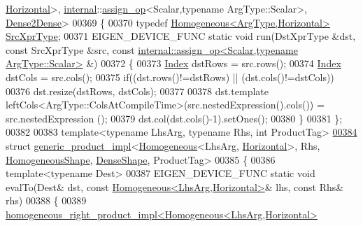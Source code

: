 \begin{DoxyCode}
      \hyperlink{group__enums_ggad49a7b3738e273eb00932271b36127f7aae8a16b3b9272683c1162915f6d892be}{Horizontal}>, \hyperlink{namespaceinternal}{internal}::\hyperlink{struct_eigen_1_1internal_1_1assign__op}{assign\_op}<Scalar,typename ArgType::Scalar>, 
      \hyperlink{struct_eigen_1_1internal_1_1_dense2_dense}{Dense2Dense}>
00369 \{
00370   \textcolor{keyword}{typedef} \hyperlink{group___geometry___module_class_eigen_1_1_homogeneous}{Homogeneous<ArgType,Horizontal>} 
      \hyperlink{group___geometry___module_class_eigen_1_1_homogeneous}{SrcXprType};
00371   EIGEN\_DEVICE\_FUNC \textcolor{keyword}{static} \textcolor{keywordtype}{void} run(DstXprType &dst, \textcolor{keyword}{const} SrcXprType &src, \textcolor{keyword}{const} 
      \hyperlink{struct_eigen_1_1internal_1_1assign__op}{internal::assign\_op<Scalar,typename ArgType::Scalar>} &)
00372   \{
00373     \hyperlink{namespace_eigen_a62e77e0933482dafde8fe197d9a2cfde}{Index} dstRows = src.rows();
00374     \hyperlink{namespace_eigen_a62e77e0933482dafde8fe197d9a2cfde}{Index} dstCols = src.cols();
00375     \textcolor{keywordflow}{if}((dst.rows()!=dstRows) || (dst.cols()!=dstCols))
00376       dst.resize(dstRows, dstCols);
00377 
00378     dst.template leftCols<ArgType::ColsAtCompileTime>(src.nestedExpression().cols()) = src.nestedExpression
      ();
00379     dst.col(dst.cols()-1).setOnes();
00380   \}
00381 \};
00382 
00383 \textcolor{keyword}{template}<\textcolor{keyword}{typename} LhsArg, \textcolor{keyword}{typename} Rhs, \textcolor{keywordtype}{int} ProductTag>
\hyperlink{struct_eigen_1_1internal_1_1generic__product__impl_3_01_homogeneous_3_01_lhs_arg_00_01_horizontae30a005e4f34a62ed132a21a8e333a29}{00384} \textcolor{keyword}{struct }\hyperlink{struct_eigen_1_1internal_1_1generic__product__impl}{generic\_product\_impl}<\hyperlink{group___geometry___module_class_eigen_1_1_homogeneous}{Homogeneous}<LhsArg,
      \hyperlink{group__enums_ggad49a7b3738e273eb00932271b36127f7aae8a16b3b9272683c1162915f6d892be}{Horizontal}>, Rhs, \hyperlink{struct_eigen_1_1_homogeneous_shape}{HomogeneousShape}, \hyperlink{struct_eigen_1_1_dense_shape}{DenseShape}, ProductTag>
00385 \{
00386   \textcolor{keyword}{template}<\textcolor{keyword}{typename} Dest>
00387   EIGEN\_DEVICE\_FUNC \textcolor{keyword}{static} \textcolor{keywordtype}{void} evalTo(Dest& dst, \textcolor{keyword}{const} 
      \hyperlink{group___geometry___module_class_eigen_1_1_homogeneous}{Homogeneous<LhsArg,Horizontal>}& lhs, \textcolor{keyword}{const} Rhs& rhs)
00388   \{
00389     \hyperlink{struct_eigen_1_1internal_1_1homogeneous__right__product__impl}{homogeneous\_right\_product\_impl<Homogeneous<LhsArg,Horizontal>}

\end{DoxyCode}
